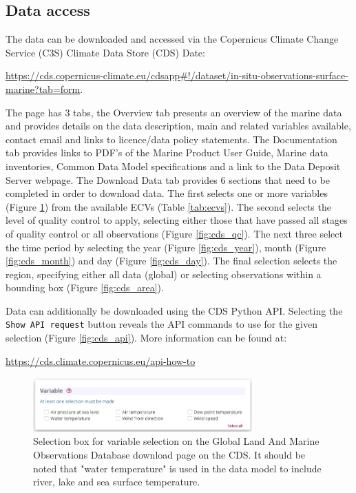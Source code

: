 \subsection{Data access}
The data can be downloaded and accessed via the Copernicus Climate Change Service (C3S) Climate Data Store (CDS) Date:
\begin{center}
\sloppy\url{https://cds.copernicus-climate.eu/cdsapp\#!/dataset/in-situ-observations-surface-marine?tab=form}.
 \end{center}
The page has 3 tabs, the Overview tab presents an overview of the marine data and provides details on the data description, main and related variables available, contact email and links to licence/data policy statements. 
The Documentation tab provides links to PDF’s of the Marine Product User Guide, Marine data inventories, Common Data Model specifications and a link to the Data Deposit Server webpage. The Download Data tab provides 6 sections that need to be completed in order to download data. The first selects one or more variables (Figure \ref{fig:cds_variable}) from the available ECVs (Table \ref{tab:ecvs}). The second selects the level of quality control to apply, selecting either those that have passed all stages of quality control or all observations (Figure \ref{fig:cds_qc}). The next three select the time period  by selecting the year (Figure \ref{fig:cds_year}), month (Figure \ref{fig:cds_month}) and day (Figure \ref{fig:cds_day}). The final selection selects the region, specifying either all data (global) or selecting observations within a bounding box (Figure \ref{fig:cds_area}).

Data can additionally be downloaded using the CDS Python API. Selecting the \texttt{Show API request} button reveals the API commands to use for the given selection (Figure \ref{fig:cds_api}). More information can be found at:
\begin{center}
\url{https://cds.climate.copernicus.eu/api-how-to}
\end{center}

\FloatBarrier
\begin{figure}[h]
\centering
\includegraphics[width=0.75\textwidth]{resources/cds_variable_select.png}
\caption{Selection box for variable selection on the Global Land And Marine Observations Database download page on the CDS. It should be noted that "water temperature" is used in the data model to include river, lake and sea surface temperature.}
\label{fig:cds_variable}
\end{figure}



